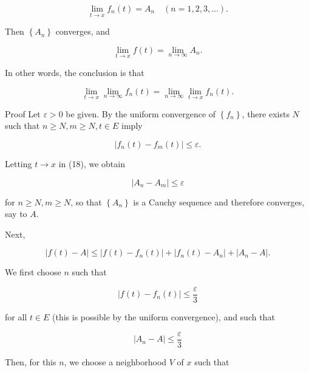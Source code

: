 \documentclass[10pt]{article}
\begin{document}
\begin{equation*}
\lim _{t \rightarrow x} f_{n}(t)=A_{n} \quad(n=1,2,3, \ldots) . \tag{15}
\end{equation*}


Then $\left\{A_{n}\right\}$ converges, and


\begin{equation*}
\lim _{t \rightarrow x} f(t)=\lim _{n \rightarrow \infty} A_{n} . \tag{16}
\end{equation*}


In other words, the conclusion is that


\begin{equation*}
\lim _{t \rightarrow x} \lim _{n \rightarrow \infty} f_{n}(t)=\lim _{n \rightarrow \infty} \lim _{t \rightarrow x} f_{n}(t) . \tag{17}
\end{equation*}


Proof Let $\varepsilon>0$ be given. By the uniform convergence of $\left\{f_{n}\right\}$, there exists $N$ such that $n \geq N, m \geq N, t \in E$ imply


\begin{equation*}
\left|f_{n}(t)-f_{m}(t)\right| \leq \varepsilon . \tag{18}
\end{equation*}


Letting $t \rightarrow x$ in (18), we obtain

$$
\left|A_{n}-A_{m}\right| \leq \varepsilon
$$

for $n \geq N, m \geq N$, so that $\left\{A_{n}\right\}$ is a Cauchy sequence and therefore converges, say to $A$.

Next,


\begin{equation*}
|f(t)-A| \leq\left|f(t)-f_{n}(t)\right|+\left|f_{n}(t)-A_{n}\right|+\left|A_{n}-A\right| . \tag{19}
\end{equation*}


We first choose $n$ such that


\begin{equation*}
\left|f(t)-f_{n}(t)\right| \leq \frac{\varepsilon}{3} \tag{20}
\end{equation*}


for all $t \in E$ (this is possible by the uniform convergence), and such that


\begin{equation*}
\left|A_{n}-A\right| \leq \frac{\varepsilon}{3} \tag{21}
\end{equation*}


Then, for this $n$, we choose a neighborhood $V$ of $x$ such that
\end{document}
